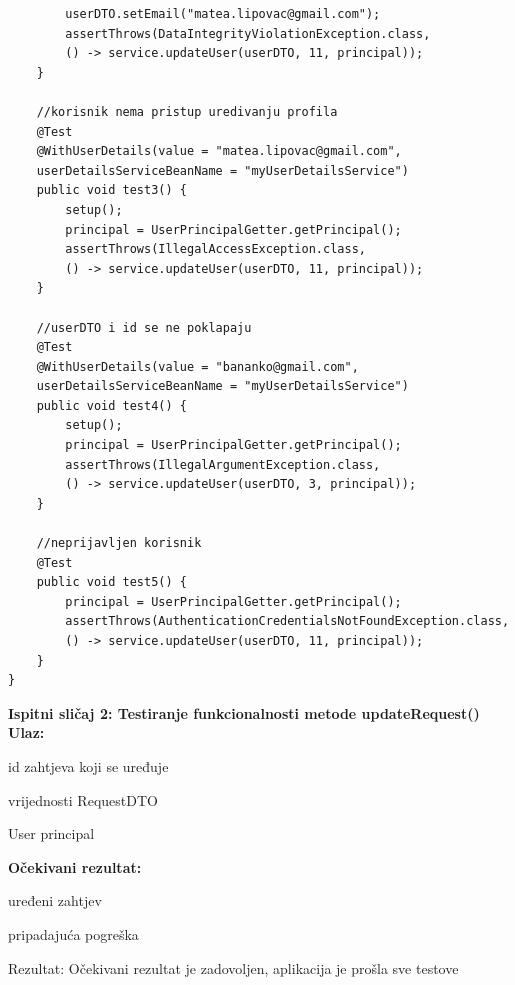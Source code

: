 \begin{verbatim}
		userDTO.setEmail("matea.lipovac@gmail.com");
		assertThrows(DataIntegrityViolationException.class, 
		() -> service.updateUser(userDTO, 11, principal));
	}

	//korisnik nema pristup uredivanju profila
	@Test
	@WithUserDetails(value = "matea.lipovac@gmail.com",
	userDetailsServiceBeanName = "myUserDetailsService")
	public void test3() {
		setup();
		principal = UserPrincipalGetter.getPrincipal();
		assertThrows(IllegalAccessException.class,
		() -> service.updateUser(userDTO, 11, principal));
	}

	//userDTO i id se ne poklapaju
	@Test
	@WithUserDetails(value = "bananko@gmail.com",
	userDetailsServiceBeanName = "myUserDetailsService")
	public void test4() {
		setup();
		principal = UserPrincipalGetter.getPrincipal();
		assertThrows(IllegalArgumentException.class,
		() -> service.updateUser(userDTO, 3, principal));
	}

	//neprijavljen korisnik
	@Test
	public void test5() {
		principal = UserPrincipalGetter.getPrincipal();
		assertThrows(AuthenticationCredentialsNotFoundException.class, 
		() -> service.updateUser(userDTO, 11, principal));
	}
}
            \end{verbatim}
			
			
				\medskip
			
			\noindent \textbf{Ispitni sličaj 2: Testiranje funkcionalnosti metode updateRequest()}\\
			
			\medskip
            \noindent\textbf{Ulaz:}
            \begin{packed_enum}
            \item id zahtjeva koji se uređuje
            \item vrijednosti RequestDTO
            \item User principal
            \end{packed_enum}
            
            \noindent\textbf{Očekivani rezultat:}
            \begin{packed_enum}
            \item uređeni zahtjev
            \item pripadajuća pogreška
            \end{packed_enum}
            
            \noindent \text
            Rezultat: Očekivani rezultat je zadovoljen, aplikacija je prošla sve testove \\
            
